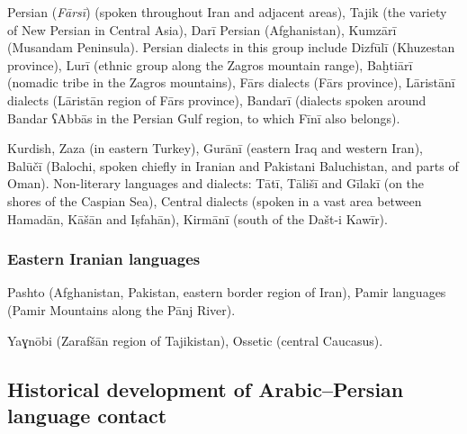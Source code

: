 \documentclass[output=paper]{langsci/langscibook}
\begin{document}
Persian (\textit{Fārsī}) (spoken throughout Iran and adjacent areas), Tajik (the variety of New Persian in Central Asia), Darī Persian (Afghanistan), Kumzārī (Musandam Peninsula). Persian dialects in this group include Dizfūlī (Khuzestan province), Lurī (ethnic group along the Zagros mountain range), Baḫtiārī (nomadic tribe in the Zagros mountains), Fārs dialects (Fārs province), Lāristānī dialects (Lāristān region of Fārs province), Bandarī (dialects spoken around Bandar ʕAbbās in the Persian Gulf region, to which Fīnī also belongs).



Kurdish, Zaza (in eastern Turkey), Gurānī (eastern Iraq and western Iran), Balūčī (Balochi, spoken chiefly in Iranian and Pakistani Baluchistan, and parts of Oman). Non-literary languages and dialects: Tātī, Tālišī and Gīlakī (on the shores of the Caspian Sea), Central dialects (spoken in a vast area between Hamadān, Kāšān and Iṣfahān), Kirmānī (south of the Dašt-i Kawīr).



\subsubsection{Eastern Iranian languages}

Pashto (Afghanistan, Pakistan, eastern border region of Iran), Pamir languages (Pamir Mountains along the Pānj River).

Yaɣnōbi (Zarafšān region of Tajikistan), Ossetic (central Caucasus).

\subsection{Historical development of Arabic–Persian language contact} %
\end{document}
